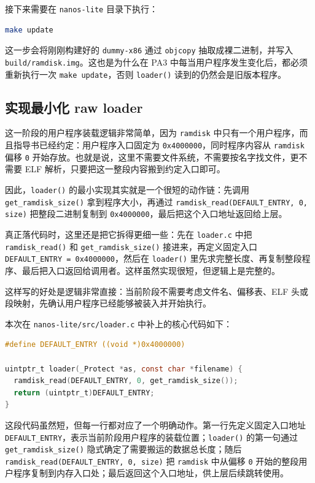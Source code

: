 \documentclass[a4paper]{article}
\begin{document}
接下来需要在 \texttt{nanos-lite} 目录下执行：
\begin{lstlisting}[language=bash]
make update
\end{lstlisting}
这一步会将刚刚构建好的 \texttt{dummy-x86} 通过 \texttt{objcopy} 抽取成裸二进制，并写入 \texttt{build/ramdisk.img}。这也是为什么在 PA3 中每当用户程序发生变化后，都必须重新执行一次 \texttt{make update}，否则 \texttt{loader()} 读到的仍然会是旧版本程序。

\subsection{实现最小化 raw loader}
这一阶段的用户程序装载逻辑非常简单，因为 \texttt{ramdisk} 中只有一个用户程序，而且指导书已经约定：用户程序入口固定为 \texttt{0x4000000}，同时程序内容从 \texttt{ramdisk} 偏移 \texttt{0} 开始存放。也就是说，这里不需要文件系统，不需要按名字找文件，更不需要 ELF 解析，只要把这一整段内容搬到约定入口即可。

因此，\texttt{loader()} 的最小实现其实就是一个很短的动作链：先调用 \texttt{get\_ramdisk\_size()} 拿到程序大小，再通过 \texttt{ramdisk\_read(DEFAULT\_ENTRY, 0, size)} 把整段二进制复制到 \texttt{0x4000000}，最后把这个入口地址返回给上层。

真正落代码时，这里还是把它拆得更细一些：先在 \texttt{loader.c} 中把 \texttt{ramdisk\_read()} 和 \texttt{get\_ramdisk\_size()} 接进来，再定义固定入口 \texttt{DEFAULT\_ENTRY = 0x4000000}，然后在 \texttt{loader()} 里先求完整长度、再复制整段程序、最后把入口返回给调用者。这样虽然实现很短，但逻辑上是完整的。

这样写的好处是逻辑非常直接：当前阶段不需要考虑文件名、偏移表、ELF 头或段映射，先确认用户程序已经能够被装入并开始执行。

本次在 \texttt{nanos-lite/src/loader.c} 中补上的核心代码如下：
\begin{lstlisting}[language=C]
#define DEFAULT_ENTRY ((void *)0x4000000)

uintptr_t loader(_Protect *as, const char *filename) {
  ramdisk_read(DEFAULT_ENTRY, 0, get_ramdisk_size());
  return (uintptr_t)DEFAULT_ENTRY;
}
\end{lstlisting}

这段代码虽然短，但每一行都对应了一个明确动作。第一行先定义固定入口地址 \texttt{DEFAULT\_ENTRY}，表示当前阶段用户程序的装载位置；\texttt{loader()} 的第一句通过 \texttt{get\_ramdisk\_size()} 隐式确定了需要搬运的数据总长度；随后 \texttt{ramdisk\_read(DEFAULT\_ENTRY, 0, size)} 把 \texttt{ramdisk} 中从偏移 \texttt{0} 开始的整段用户程序复制到内存入口处；最后返回这个入口地址，供上层后续跳转使用。
\end{document}
